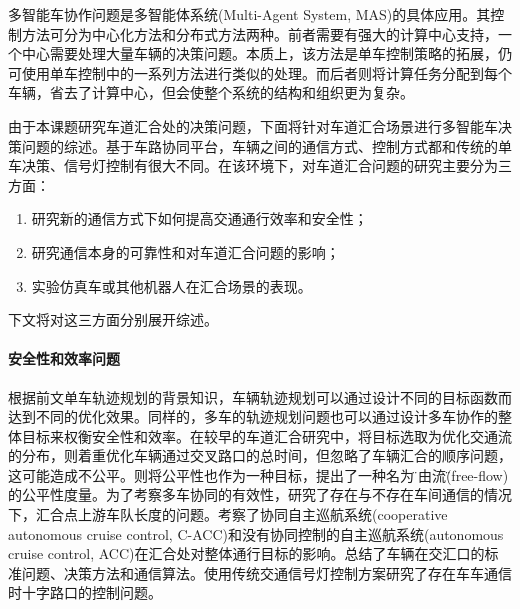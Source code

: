     多智能车协作问题是多智能体系统(Multi-Agent System, MAS)的具体应用。其控制方法可分为中心化方法和分布式方法两种。前者需要有强大的计算中心支持，一个中心需要处理大量车辆的决策问题。本质上，该方法是单车控制策略的拓展，仍可使用单车控制中的一系列方法进行类似的处理。而后者则将计算任务分配到每个车辆，省去了计算中心，但会使整个系统的结构和组织更为复杂。

    由于本课题研究车道汇合处的决策问题，下面将针对车道汇合场景进行多智能车决策问题的综述。基于车路协同平台，车辆之间的通信方式、控制方式都和传统的单车决策、信号灯控制有很大不同。在该环境下，对车道汇合问题的研究主要分为三方面：

    \begin{enumerate}[label=(\arabic*)]
    \item 研究新的通信方式下如何提高交通通行效率和安全性；
    \item 研究通信本身的可靠性和对车道汇合问题的影响；
    \item 实验仿真车或其他机器人在汇合场景的表现。
    \end{enumerate}

    下文将对这三方面分别展开综述。


    \paragraph{安全性和效率问题}
    根据前文单车轨迹规划的背景知识，车辆轨迹规划可以通过设计不同的目标函数而达到不同的优化效果。同样的，多车的轨迹规划问题也可以通过设计多车协作的整体目标来权衡安全性和效率。在较早的车道汇合研究中，\cite{Kanaris2001Strategies}将目标选取为优化交通流的分布，\cite{Raravi2007Merge}则着重优化车辆通过交叉路口的总时间，但忽略了车辆汇合的顺序问题，这可能造成不公平。\cite{Baselt2014Merging}则将公平性也作为一种目标，提出了一种名为\"自由流\"(free-flow)的公平性度量。为了考察多车协同的有效性，\cite{Xu2002Effects}研究了存在与不存在车间通信的情况下，汇合点上游车队长度的问题。\cite{Xu2003Simulation}考察了协同自主巡航系统(cooperative autonomous cruise control, C-ACC)和没有协同控制的自主巡航系统(autonomous cruise control, ACC)在汇合处对整体通行目标的影响。\cite{Wang2009Robust}总结了车辆在交汇口的标准问题、决策方法和通信算法。\cite{Gradinescu2007Adaptive}使用传统交通信号灯控制方案研究了存在车车通信时十字路口的控制问题。
